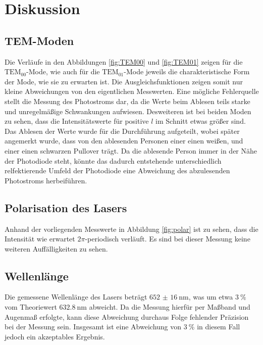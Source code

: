 \section{Diskussion}
\label{sec:Diskussion}

\subsection{TEM-Moden}

Die Verläufe in den Abbildungen \ref{fig:TEM00} und \ref{fig:TEM01} zeigen für die $\text{TEM}_{00}$-Mode, wie auch für die $\text{TEM}_{01}$-Mode jeweils
die charakteristische Form der Mode, wie sie zu erwarten ist. Die Ausgleichsfunktionen zeigen somit nur kleine Abweichungen von den 
eigentlichen Messwerten. Eine mögliche Fehlerquelle stellt die Messung des Photostroms dar, da die Werte beim Ablesen teils starke und 
unregelmäßige Schwankungen aufwiesen. Desweiteren ist bei beiden Moden zu sehen, dass die Intensitätswerte für positive $l$ im Schnitt etwas 
größer sind. Das Ablesen der Werte wurde für die Durchführung aufgeteilt, wobei später angemerkt wurde, dass von den ablesenden Personen 
einer einen weißen, und einer einen schwarzen Pullover trägt. Da die ablesende Person immer in der Nähe der Photodiode steht, könnte das dadurch
entstehende unterschiedlich relfektierende Umfeld der Photodiode eine Abweichung des abzulesenden Photostroms herbeiführen. 

\subsection{Polarisation des Lasers}

Anhand der vorliegenden Messwerte in Abbildung \ref{fig:polar} ist zu sehen, dass die Intensität wie erwartet $2\pi$-periodisch verläuft. Es sind bei dieser 
Messung keine weiteren Auffälligkeiten zu sehen. 

\subsection{Wellenlänge}

Die gemessene Wellenlänge des Lasers beträgt $\SI{652(16)}{\nano\m}$, was um etwa $\SI{3}{\percent}$ vom Theoriewert $\SI{632.8}{\nano\m}$ 
abweicht. Da die Messung hierfür per Maßband und Augenmaß erfolgte, kann diese Abweichung durchaus Folge fehlender Präzision bei der Messung sein. 
Insgesamt ist eine Abweichung von $\SI{3}{\percent}$ in diesem Fall jedoch ein akzeptables Ergebnis. 